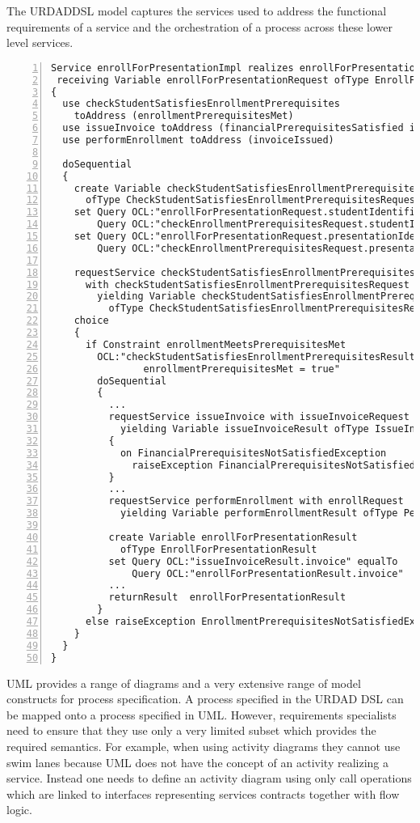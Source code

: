 The URDADDSL model captures the services used to address the functional requirements of a service and the orchestration of a process across these lower level services.
\tiny \begin{lstlisting}[numbers=left,escapechar=|]
Service enrollForPresentationImpl realizes enrollForPresentation 
 receiving Variable enrollForPresentationRequest ofType EnrollForPresentationRequest
{
  use checkStudentSatisfiesEnrollmentPrerequisites 
    toAddress (enrollmentPrerequisitesMet)
  use issueInvoice toAddress (financialPrerequisitesSatisfied invoiceIssued) 
  use performEnrollment toAddress (invoiceIssued)
   
  doSequential
  {
    create Variable checkStudentSatisfiesEnrollmentPrerequisitesRequest 
      ofType CheckStudentSatisfiesEnrollmentPrerequisitesRequest               
    set Query OCL:"enrollForPresentationRequest.studentIdentifier" equalTo 
        Query OCL:"checkEnrollmentPrerequisitesRequest.studentIdentifier"
    set Query OCL:"enrollForPresentationRequest.presentationIdentifier" equalTo
        Query OCL:"checkEnrollmentPrerequisitesRequest.presentationIdentifier"
                     
    requestService checkStudentSatisfiesEnrollmentPrerequisites 
      with checkStudentSatisfiesEnrollmentPrerequisitesRequest 
        yielding Variable checkStudentSatisfiesEnrollmentPrerequisitesResult
          ofType CheckStudentSatisfiesEnrollmentPrerequisitesResult
    choice
    {
      if Constraint enrollmentMeetsPrerequisitesMet 
        OCL:"checkStudentSatisfiesEnrollmentPrerequisitesResult.
                enrollmentPrerequisitesMet = true"
        doSequential
        {
          ...
          requestService issueInvoice with issueInvoiceRequest 
            yielding Variable issueInvoiceResult ofType IssueInvoiceResult
          {
            on FinancialPrerequisitesNotSatisfiedException 
              raiseException FinancialPrerequisitesNotSatisfiedException
          }
	      ...
          requestService performEnrollment with enrollRequest 
            yielding Variable performEnrollmentResult ofType PerformEnrollmentResult
          
          create Variable enrollForPresentationResult 
            ofType EnrollForPresentationResult
          set Query OCL:"issueInvoiceResult.invoice" equalTo
              Query OCL:"enrollForPresentationResult.invoice"
          ...                       
          returnResult  enrollForPresentationResult
        }
      else raiseException EnrollmentPrerequisitesNotSatisfiedException
    }
  }
}                 
\end{lstlisting}\normalsize
UML provides a range of diagrams and a very extensive range of model constructs for process specification. A process specified in the URDAD DSL can be mapped onto a process specified in UML. However, requirements specialists need to ensure that they use only a very limited subset which provides the required semantics. For example, when using activity diagrams they cannot use swim lanes because UML does not have the concept of an activity realizing a service. Instead one needs to define an activity diagram using only call operations which are linked to interfaces representing services contracts together with flow logic.

